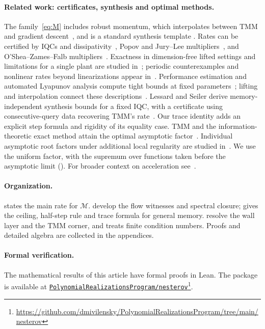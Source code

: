 \documentclass[11pt]{article}
\theoremstyle{definition}
\theoremstyle{remark}
\newcommand{\cM}{\mathcal M}
\begin{document}
\paragraph{Related work: certificates, synthesis and optimal methods.}
The family~\eqref{eq:M} includes robust momentum, which interpolates between TMM
and gradient descent~\cite{CHVL18}, and is a standard synthesis template
\cite{LRP16,SE21,MSE21}.
Rates can be certified by IQCs and dissipativity~\cite{MR97,LRP16,HL17},
Popov and Jury--Lee multipliers~\cite{Pop62,JL64}, and O'Shea--Zames--Falb
multipliers~\cite{OY67,ZF68,WB68,CTH16,ZCH22,SSCK23}.
Exactness in dimension-free lifted settings and limitations for a single
plant are studied in~\cite{KS24,Kha26}; periodic counterexamples and
nonlinear rates beyond linearizations appear in~\cite{SC21,ZSC22}.
Performance estimation and automated Lyapunov analysis compute tight bounds
at fixed parameters~\cite{DT14,THG17,TVSL18,UBTG25}; lifting and interpolation
connect these descriptions~\cite{VSL22}.
Lessard and Seiler derive memory-independent synthesis bounds for a fixed IQC,
with a certificate using consecutive-query data recovering TMM's rate~\cite{LS20}.  Our trace identity
adds an explicit step formula and rigidity of its equality case.
TMM and the information-theoretic exact method attain the optimal asymptotic
factor~\cite{VFL18,TD23,DT22}.
Individual asymptotic root factors under additional local regularity are
studied in~\cite{VSL25,CX26}.  We use the uniform factor, with the supremum
over functions taken before the asymptotic limit ().
For broader context on acceleration see~\cite{dST21}.


\paragraph{Organization.}
 states the main rate for \(\cM\).
 develop the flow witnesses and spectral closure;
 gives the ceiling, half-step rule and trace formula for
general memory.   resolve the wall layer and the
TMM corner, and  treats finite condition numbers.
Proofs and detailed algebra are collected in the appendices.

\paragraph{Formal verification.}
The mathematical results of this article have formal proofs in Lean. The package is available at
\href{https://github.com/dmivilensky/PolynomialRealizationsProgram/tree/main/nesterov}{\texttt{PolynomialRealizationsProgram/}\allowbreak\texttt{nesterov}}\footnote{\url{https://github.com/dmivilensky/PolynomialRealizationsProgram/tree/main/nesterov}}.
\end{document}
